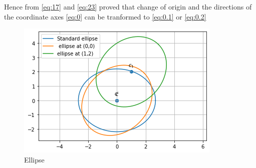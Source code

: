 \documentclass[journal,12pt,twocolumn]{IEEEtran}
\begin{document}
Hence from \eqref{eq:17} and \eqref{eq:23} proved that change of origin and the directions of the coordinate axes \eqref{eq:0} can be tranformed to \eqref{eq:0.1} or \eqref{eq:0.2}
\begin{figure}[!ht]
\centering
\includegraphics[width=\columnwidth]{Ellipse.png}
\caption{Ellipse}
\label{fig:Ellipse}
\end{figure}
\end{document}

